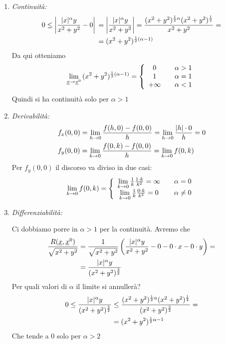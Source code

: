 \begin{enumerate}
	\begin{enumerate}
		\item \textit{Continuità:}
			\begin{align}
			0\leq \left| \frac{|x|^\alpha y}{x^2 + y^2} -0 \right| {}&= \left| \frac{|x|^\alpha y}{x^2 + y^2} \right|= \frac{(x^2 + y^2)^{\frac{1}{2}\alpha} (x^2 + y^2)^{\frac{1}{2}}}{x^2 + y^2} = \nonumber \\
			&=(x^2 + y^2)^{\frac{1}{2}(\alpha-1)}
			\end{align}
		Da qui otteniamo
		\begin{align}
		\underset{\underline{x} \rightarrow \underline{x}^0}{\lim} \, (x^2 + y^2)^{\frac{1}{2}(\alpha-1)} = \left\{\begin{array}{cc} 0 \quad {}& \alpha>1 \\ 1 \quad &\alpha=1 \\ +\infty \quad &\alpha <1 \end{array}\right.
		\end{align}
		Quindi si ha continuità solo per $\alpha > 1$
		
		\item \textit{Derivabilità:}
		\begin{align}
		& f_x(0,0) = \underset{h \rightarrow 0}{\lim} \, \frac{f(h,0) - f(0,0)}{h}= \underset{h \rightarrow 0}{\lim} \, \frac{|h|\cdot 0}{h}=0\\
		&f_y(0,0) = \underset{k \rightarrow 0}{\lim} \, \frac{f(0,k) - f(0,0)}{h}= \underset{k \rightarrow 0}{\lim} \, f(0,k)
		\end{align}
		Per $f_y(0,0)$ il discorso va diviso in due casi:
		\begin{align}
		\underset{k \rightarrow 0}{\lim} \, f(0,k) = \left\{\begin{array}{cc} \underset{k \rightarrow 0}{\lim} \, \frac{1}{k} \frac{1 \cdot k}{k^2} = \infty \quad {}& \alpha=0 \\ \underset{k \rightarrow 0}{\lim} \, \frac{1}{k} \frac{0 \cdot k}{k^2}=0 \quad & \alpha \neq 0 \end{array}\right.
		\end{align}
		
		\item \textit{Differenziabilità:}
		
		Ci dobbiamo porre in $\alpha >1$ per la continuità. Avremo che		
		\begin{align}
		\frac{R(\underline{x},\underline{x}^0)}{\sqrt{x^2 + y^2}} {}&= \frac{1}{\sqrt{x^2 + y^2}} \left( \frac{|x|^\alpha y}{x^2 + y^2} - 0 - 0\cdot x - 0 \cdot y \right)= \nonumber \\
		&= \frac{|x|^\alpha y}{(x^2 + y^2)^\frac{3}{2}}
		\end{align}
		Per quali valori di $\alpha$ il limite si annullerà?
		\begin{align}
		0\leq \frac{|x|^\alpha y}{(x^2 + y^2)^\frac{3}{2}} {}&\leq \frac{(x^2 +y^2)^{\frac{1}{2}\alpha} (x^2 +y^2)^{\frac{1}{2}}}{(x^2 + y^2)^\frac{3}{2}}= \nonumber \\
		&= (x^2 +y^2)^{\frac{1}{2}\alpha -1}
		\end{align}
		Che tende a $0$ solo per $\alpha >2$ 
		\end{enumerate}
\end{enumerate}

